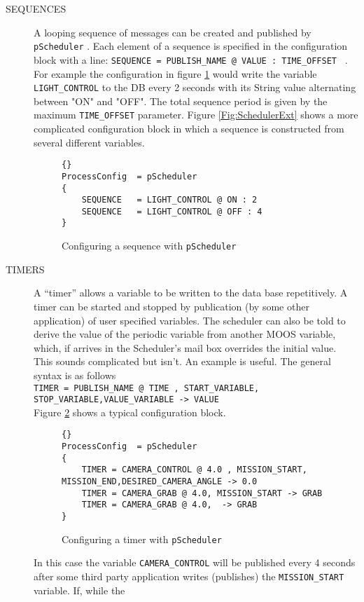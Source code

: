 \documentclass[a4paper,10pt]{article}
\newcommand{\Code}[1]{\texttt{#1} }
\newcommand{\code}[1]{\Code{#1} }
\begin{document}
\begin{description}
\item[SEQUENCES] A looping sequence of messages can be created and published by \code{pScheduler}. Each element of a
sequence is specified in the configuration block  with a line:
\code{SEQUENCE = PUBLISH\_NAME @ VALUE : TIME\_OFFSET }. For
example the configuration in figure \ref{Fig:Sequences} would
write the variable \code{LIGHT\_CONTROL} to the DB every 2 seconds
with its String value alternating between "ON" and "OFF". The
total sequence period is given by the maximum \code{TIME\_OFFSET}
parameter. Figure \ref{Fig:SchedulerExt} shows a more complicated
configuration block in which a sequence is constructed from
several different variables.
\begin{figure}[ht]
\label{Fig:Sequences}
\begin{lstlisting}[]{}
ProcessConfig  = pScheduler
{
    SEQUENCE   = LIGHT_CONTROL @ ON : 2
    SEQUENCE   = LIGHT_CONTROL @ OFF : 4
}
\end{lstlisting}\caption{Configuring a sequence with \code{pScheduler}}
\end{figure}
\item[TIMERS] A ``timer'' allows a variable to be written to the
data base repetitively. A timer can be started and stopped by
publication (by some other application) of user specified
variables. The scheduler can also be told  to derive the  value of
the periodic variable from another MOOS variable, which, if
arrives in the Scheduler's mail box overrides the initial value.
This sounds complicated but isn't. An example is useful. The
general syntax is as follows\\
\code{TIMER = PUBLISH\_NAME @ TIME , START\_VARIABLE,
STOP\_VARIABLE,VALUE\_VARIABLE -> VALUE}\\
Figure \ref{Fig:TIMER} shows a typical configuration block.
\begin{figure}[ht]
\label{Fig:TIMER}
\begin{lstlisting}[]{}
ProcessConfig  = pScheduler 
{
    TIMER = CAMERA_CONTROL @ 4.0 , MISSION_START,  MISSION_END,DESIRED_CAMERA_ANGLE -> 0.0
    TIMER = CAMERA_GRAB @ 4.0, MISSION_START -> GRAB
    TIMER = CAMERA_GRAB @ 4.0,  -> GRAB
}
\end{lstlisting}\caption{Configuring a timer with \code{pScheduler}}
\end{figure}
In this case the variable \code{CAMERA\_CONTROL} will be published
every 4 seconds after some third party application writes
(publishes) the \code{MISSION\_START} variable. If, while the

\end{description}
\end{document}
